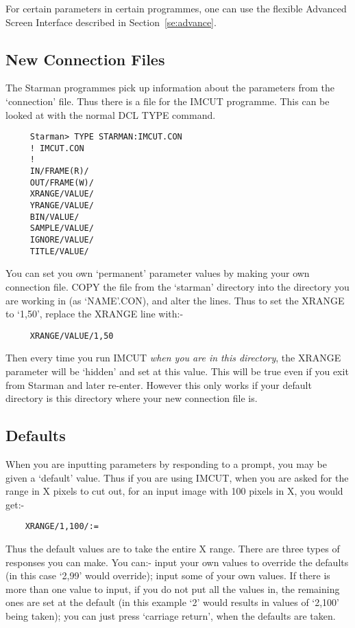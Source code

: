 For certain parameters in certain programmes, one can use the flexible Advanced
Screen Interface described in Section~\ref{se:advance}.

\subsection{New Connection Files}

The Starman programmes pick up information about the parameters from
the `connection' file. Thus there is a file for the IMCUT programme.
This can be looked at with the normal {\small DCL} TYPE command.
\begin{verbatim}
     Starman> TYPE STARMAN:IMCUT.CON
     ! IMCUT.CON
     !
     IN/FRAME(R)/
     OUT/FRAME(W)/
     XRANGE/VALUE/
     YRANGE/VALUE/
     BIN/VALUE/
     SAMPLE/VALUE/
     IGNORE/VALUE/
     TITLE/VALUE/
\end{verbatim}

You can set you own `permanent' parameter values by making your own
connection file. COPY the file from the `starman' directory into the
directory you are working in (as `NAME'.CON), and alter the lines. Thus to
set the XRANGE to `1,50', replace the XRANGE line with:- 

\begin{verbatim}
     XRANGE/VALUE/1,50
\end{verbatim}

Then every time you run IMCUT {\em when you are in this directory},
the XRANGE parameter will be `hidden' and set at this value. This
will be true even if you exit from Starman and later re-enter. However
this only works if your default directory is this directory where your
new connection file is.

\subsection{Defaults}
\label{se:param_def}

When you are inputting parameters by responding to a prompt, you may be
given a `default' value. Thus if you are using IMCUT, when you are asked
for the range in X pixels to cut out, for an input image with 100 pixels in 
X, you would get:-
\begin{verbatim}
    XRANGE/1,100/:=
\end{verbatim}

Thus the default values are to take the entire X range. There are three 
types of responses you can make. You can:- input your own values to override
the defaults (in this case `2,99' would override); input some of your
own values. If there is more than one value to input, if you do not put
all the values in, the remaining ones are set at the default (in this 
example `2' would results in values of `2,100' being taken); you can
just press `carriage return', when the defaults are taken.

